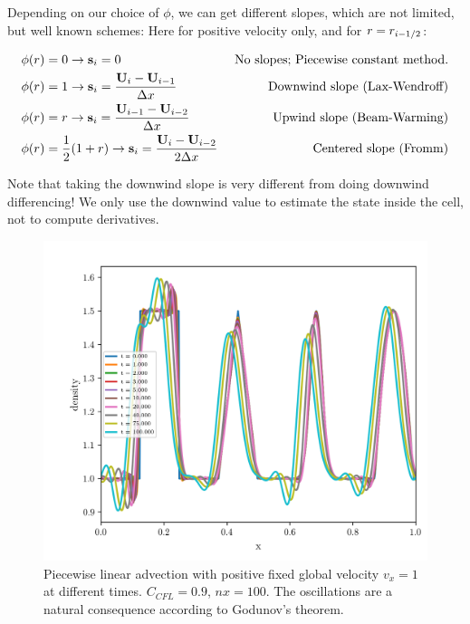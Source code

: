 Depending on our choice of $\phi$, we can get different slopes, which are not limited, but well known schemes:
Here for positive velocity only, and for $r = r_{i-1/2}$:

\begin{align}
	\phi(r) & = 0 \rightarrow \mathbf{s}_i = 0 
		&\text{ No slopes; Piecewise constant method.}\\
	\phi(r) & = 1 \rightarrow \mathbf{s}_i = \frac{\mathbf{U}_{i} - \mathbf{U}_{i-1}}{\Delta x} 
		&\text{ Downwind slope (Lax-Wendroff)} \\
	\phi(r) & = r \rightarrow \mathbf{s}_i = \frac{\mathbf{U}_{i-1} - \mathbf{U}_{i-2}}{\Delta x} 
		&\text{Upwind slope (Beam-Warming)} \\
	\phi(r) & = \frac{1}{2} (1 + r) \rightarrow \mathbf{s}_i = \frac{\mathbf{U}_{i} - \mathbf{U}_{i-2}}{2 \Delta x} 
		&\text{ Centered slope (Fromm)} \\
\end{align}



Note that taking the downwind slope is very different from doing downwind differencing!
We only use the downwind value to estimate the state inside the cell, not to compute derivatives.




\begin{figure}
	\centering
	\includegraphics[width=.9\textwidth]{./figures/advection-pwlin-four-shapes.png}%
	\caption{
		\label{fig:advection-pwlin-four-shapes-fixed-positive-vel}
		Piecewise linear advection with positive fixed global velocity $v_x = 1$ at different times. 
		$C_{CFL} = 0.9$,  $nx = 100$.
		The oscillations are a natural consequence according to Godunov's theorem.
	}
\end{figure}








